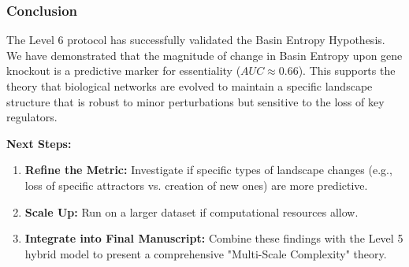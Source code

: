 \subsubsection{Conclusion}
The Level 6 protocol has successfully validated the Basin Entropy Hypothesis. We have demonstrated that the magnitude of change in Basin Entropy upon gene knockout is a predictive marker for essentiality ($AUC \approx 0.66$). This supports the theory that biological networks are evolved to maintain a specific landscape structure that is robust to minor perturbations but sensitive to the loss of key regulators.

\textbf{Next Steps:}
\begin{enumerate}
    \item \textbf{Refine the Metric:} Investigate if specific types of landscape changes (e.g., loss of specific attractors vs. creation of new ones) are more predictive.
    \item \textbf{Scale Up:} Run on a larger dataset if computational resources allow.
    \item \textbf{Integrate into Final Manuscript:} Combine these findings with the Level 5 hybrid model to present a comprehensive "Multi-Scale Complexity" theory.
\end{enumerate}

